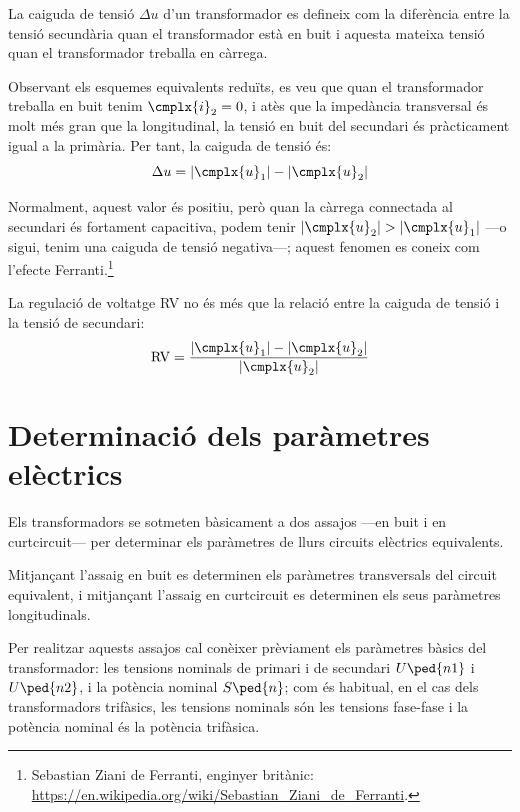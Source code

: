 La caiguda de tensió $\Delta u$ d'un transformador  es defineix com la diferència entre la tensió secundària quan el transformador està en buit i aquesta mateixa tensió quan el transformador treballa en càrrega.

Observant els esquemes equivalents reduïts, es veu que quan el transformador treballa en buit tenim $\cmplx{i}_2=0$, i atès que la impedància transversal és molt més gran que la longitudinal, la tensió en buit del secundari és pràcticament igual a la primària. Per tant, la caiguda de tensió és:
\begin{equation}
    \Delta u = |\cmplx{u}_1| - |\cmplx{u}_2|
\end{equation}

Normalment, aquest valor és positiu, però quan la càrrega connectada al secundari és fortament capacitiva, podem tenir  $|\cmplx{u}_2| > |\cmplx{u}_1|$ ---o sigui, tenim una caiguda de tensió negativa---; aquest fenomen  es coneix com l'efecte Ferranti.\footnote{Sebastian Ziani de Ferranti, enginyer britànic: \href{https://en.wikipedia.org/wiki/Sebastian_Ziani_de_Ferranti}{https:/\!\!/en.wikipedia.org/wiki/Sebastian\_Ziani\_de\_Ferranti}.}

La regulació de voltatge RV no és més que la relació entre la caiguda de tensió i la tensió de secundari:
\begin{equation}
    \text{RV} = \frac{|\cmplx{u}_1| - |\cmplx{u}_2|}{|\cmplx{u}_2|}
\end{equation}

\section{Determinació dels paràmetres elèctrics}\label{sec:determ-param-trafo}

Els transformadors se sotmeten bàsicament a dos assajos ---en
buit i en curtcircuit--- per determinar els paràmetres
de llurs circuits elèctrics equivalents.

Mitjançant l'assaig en buit es determinen els paràmetres
transversals del circuit equivalent, i mitjançant l'assaig en curtcircuit es determinen els seus paràmetres longitudinals.

Per  realitzar aquests assajos cal conèixer prèviament els paràmetres
bàsics del transformador: les tensions nominals de primari i de
secundari $U\ped{n1}$ i $U\ped{n2}$, i la potència nominal
$S\ped{n}$; com és habitual, en el cas dels transformadors
trifàsics, les tensions nominals són les tensions fase-fase i la
potència nominal és la potència trifàsica.

